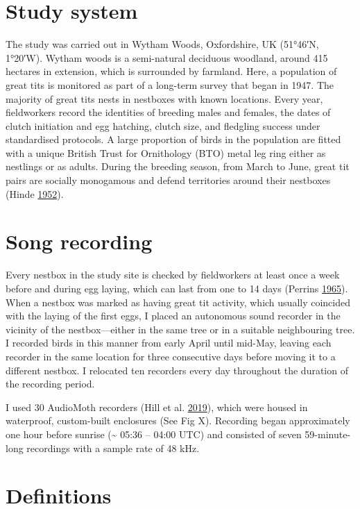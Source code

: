\documentclass[]{report}
\begin{document}
\hypertarget{study-system}{%
\section{Study system}\label{study-system}}

The study was carried out in Wytham Woods, Oxfordshire, UK (51°46′N,
1°20′W). Wytham woods is a semi-natural deciduous woodland, around 415
hectares in extension, which is surrounded by farmland. Here, a
population of great tits is monitored as part of a long-term survey that
began in 1947. The majority of great tits nests in nestboxes with known
locations. Every year, fieldworkers record the identities of breeding
males and females, the dates of clutch initiation and egg hatching,
clutch size, and fledgling success under standardised protocols. A large
proportion of birds in the population are fitted with a unique British
Trust for Ornithology (BTO) metal leg ring either as nestlings or as
adults. During the breeding season, from March to June, great tit pairs
are socially monogamous and defend territories around their nestboxes
(Hinde \protect\hyperlink{ref-Hinde1952}{1952}).

\hypertarget{song-recording}{%
\section{Song recording}\label{song-recording}}

Every nestbox in the study site is checked by fieldworkers at least once
a week before and during egg laying, which can last from one to 14 days
(Perrins \protect\hyperlink{ref-Perrins1965}{1965}). When a nestbox was
marked as having great tit activity, which usually coincided with the
laying of the first eggs, I placed an autonomous sound recorder in the
vicinity of the nestbox---either in the same tree or in a suitable
neighbouring tree. I recorded birds in this manner from early April
until mid-May, leaving each recorder in the same location for three
consecutive days before moving it to a different nestbox. I relocated
ten recorders every day throughout the duration of the recording period.

I used 30 AudioMoth recorders (Hill et al.
\protect\hyperlink{ref-Hill2019b}{2019}), which were housed in
waterproof, custom-built enclosures (See Fig X). Recording began
approximately one hour before sunrise (\textasciitilde{} 05:36 -- 04:00
UTC) and consisted of seven 59-minute-long recordings with a sample rate
of 48 kHz.

\hypertarget{definitions}{%
\section{Definitions}\label{definitions}}
\end{document}
